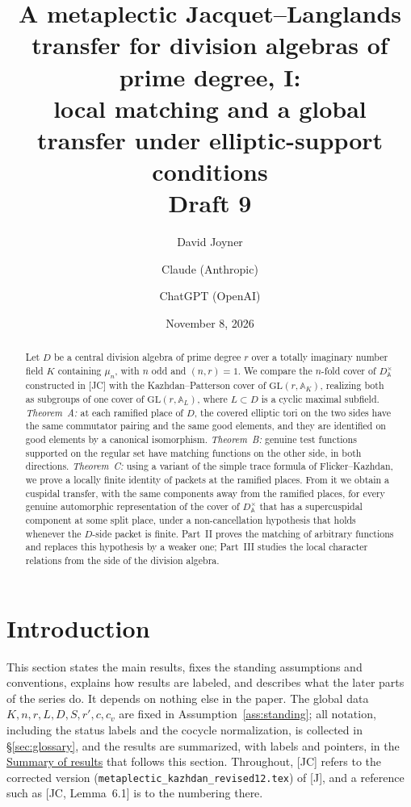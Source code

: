 \documentclass[12pt]{article}
\title{A metaplectic Jacquet--Langlands transfer for division algebras of prime degree, I:\\ local matching and a global transfer under elliptic-support conditions\\[0.4em]\normalsize Draft 9}
\author{David Joyner \and Claude (Anthropic) \and ChatGPT (OpenAI)}
\date{November 8, 2026}
\newcommand{\A}{\mathbb{A}}
\newcommand{\GL}{\mathrm{GL}}
\theoremstyle{plain}
\theoremstyle{definition}
\begin{document}
\maketitle

\begin{abstract}
Let $D$ be a central division algebra of prime degree $r$ over a totally imaginary number field $K$ containing $\mu_n$, with $n$ odd and $(n,r)=1$. We compare the $n$-fold cover of $D^\times_{\A}$ constructed in [JC] with the Kazhdan--Patterson cover of $\GL(r,\A_K)$, realizing both as subgroups of one cover of $\GL(r,\A_L)$, where $L\subset D$ is a cyclic maximal subfield. \emph{Theorem~A:} at each ramified place of $D$, the covered elliptic tori on the two sides have the same commutator pairing and the same good elements, and they are identified on good elements by a canonical isomorphism. \emph{Theorem~B:} genuine test functions supported on the regular set have matching functions on the other side, in both directions. \emph{Theorem~C:} using a variant of the simple trace formula of Flicker--Kazhdan, we prove a locally finite identity of packets at the ramified places. From it we obtain a cuspidal transfer, with the same components away from the ramified places, for every genuine automorphic representation of the cover of $D^\times_{\A}$ that has a supercuspidal component at some split place, under a non-cancellation hypothesis that holds whenever the $D$-side packet is finite. Part~II proves the matching of arbitrary functions and replaces this hypothesis by a weaker one; Part~III studies the local character relations from the side of the division algebra.
\end{abstract}

\tableofcontents

\section{Introduction}\label{sec:intro}
This section states the main results, fixes the standing assumptions and conventions, explains how results are labeled, and describes what the later parts of the series do. It depends on nothing else in the paper. The global data $K,n,r,L,D,S,r',c,c_v$ are fixed in Assumption~\ref{ass:standing}; all notation, including the status labels and the cocycle normalization, is collected in \S\ref{sec:glossary}, and the results are summarized, with labels and pointers, in the \hyperref[sec:summary]{Summary of results} that follows this section. Throughout, [JC] refers to the corrected version (\texttt{metaplectic\_kazhdan\_revised12.tex}) of [J], and a reference such as [JC, Lemma~6.1] is to the numbering there.
\end{document}
